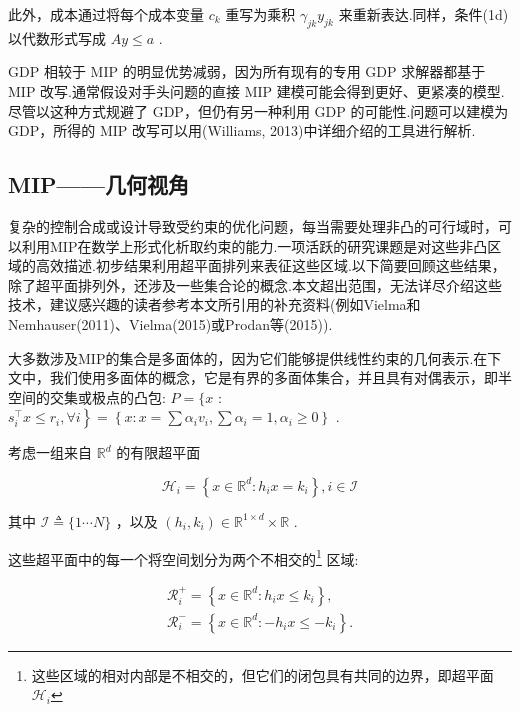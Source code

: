 \documentclass[10pt]{article}
\begin{document}
此外，成本通过将每个成本变量 \({c}_{k}\) 重写为乘积 \({\gamma }_{jk}{y}_{jk}\) 来重新表达.同样，条件(1d)以代数形式写成 \({Ay} \leq  a\) .

GDP 相较于 MIP 的明显优势减弱，因为所有现有的专用 GDP 求解器都基于 MIP 改写.通常假设对手头问题的直接 MIP 建模可能会得到更好、更紧凑的模型.尽管以这种方式规避了 GDP，但仍有另一种利用 GDP 的可能性.问题可以建模为 GDP，所得的 MIP 改写可以用(Williams, 2013)中详细介绍的工具进行解析.

\subsection{MIP——几何视角}

复杂的控制合成或设计导致受约束的优化问题，每当需要处理非凸的可行域时，可以利用MIP在数学上形式化析取约束的能力.一项活跃的研究课题是对这些非凸区域的高效描述.初步结果利用超平面排列来表征这些区域.以下简要回顾这些结果，除了超平面排列外，还涉及一些集合论的概念.本文超出范围，无法详尽介绍这些技术，建议感兴趣的读者参考本文所引用的补充资料(例如Vielma和Nemhauser(2011)、Vielma(2015)或Prodan等(2015)).

大多数涉及MIP的集合是多面体的，因为它们能够提供线性约束的几何表示.在下文中，我们使用多面体的概念，它是有界的多面体集合，并且具有对偶表示，即半空间的交集或极点的凸包: \(P = \{ x\) : \(\left. {{s}_{i}^{\top }x \leq  {r}_{i},\forall i}\right\}   = \left\{  {x : x = \sum {\alpha }_{i}{v}_{i},\sum {\alpha }_{i} = 1,{\alpha }_{i} \geq  0}\right\}\) .

考虑一组来自 \({\mathbb{R}}^{d}\) 的有限超平面

\begin{equation}
{\mathcal{H}}_{i} = \left\{  {x \in  {\mathbb{R}}^{d} : {h}_{i}x = {k}_{i}}\right\}  ,i \in  \mathcal{I}
\end{equation}

其中 \(\mathcal{I} \triangleq  \{ 1\cdots N\}\) ，以及 \(\left( {{h}_{i},{k}_{i}}\right)  \in  {\mathbb{R}}^{1 \times  d} \times  \mathbb{R}\) .

这些超平面中的每一个将空间划分为两个不相交的\footnote{这些区域的相对内部是不相交的，但它们的闭包具有共同的边界，即超平面 \({\mathcal{H}}_{i}\)} 区域:

\begin{subequations}
\begin{gather}
{\mathcal{R}}_{i}^{ + } = \left\{  {x \in  {\mathbb{R}}^{d} : {h}_{i}x \leq  {k}_{i}}\right\}  , \\
{\mathcal{R}}_{i}^{ - } = \left\{  {x \in  {\mathbb{R}}^{d} :  - {h}_{i}x \leq   - {k}_{i}}\right\}  .
\end{gather}
\end{subequations}
\end{document}
